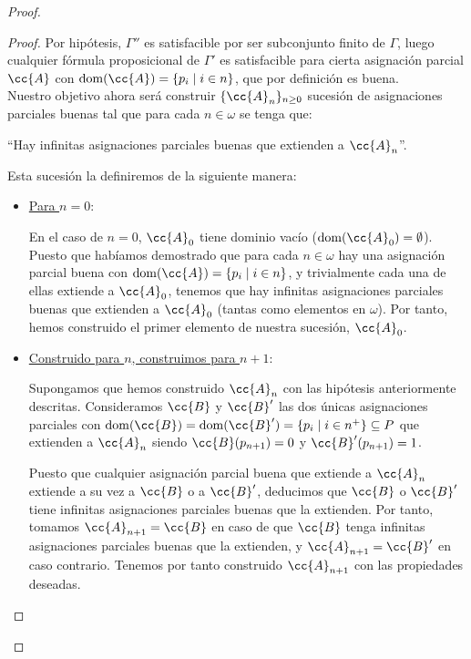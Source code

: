 \documentclass[12pt]{article}
\DeclareMathOperator{\dom}{dom}
\begin{document}
\begin{ejercicio}
\begin{proof}
\begin{description}
\begin{lema}
\begin{proof}
                        Por hipótesis, $\Gamma''$ es satisfacible por ser subconjunto finito de $\Gamma$, luego cualquier fórmula proposicional de $\Gamma'$ es satisfacible para 
                        cierta asignación parcial $\cc{A}$ con $\dom(\cc{A})=\{p_i\mid i\in n\}$, que por definición es buena.\\

                        Nuestro objetivo ahora será construir $\{\cc{A}_n\}_{n\geq 0}$ sucesión de asignaciones parciales buenas tal que para cada $n\in \omega$ se tenga que:
                        \begin{center}
                            ``Hay infinitas asignaciones parciales buenas que extienden a $\cc{A}_n$''.
                        \end{center}
                        
                        Esta sucesión la definiremos de la siguiente manera:
                        \begin{itemize}
                            \item \ul{Para $n=0$}:
                            
                            En el caso de $n=0$, $\cc{A}_0$ tiene dominio vacío ($\dom(\cc{A}_0)=\emptyset$).
                            Puesto que habíamos demostrado que para cada $n\in \omega$ hay una asignación parcial buena con $\dom(\cc{A})=\{p_i\mid i\in n\}$,
                            y trivialmente cada una de ellas extiende a $\cc{A}_0$, tenemos que hay infinitas asignaciones parciales buenas que extienden a $\cc{A}_0$ (tantas como elementos en $\omega$).
                            Por tanto, hemos construido el primer elemento de nuestra sucesión, $\cc{A}_0$.

                            \item \ul{Construido para $n$, construimos para $n+1$}:
                            
                            Supongamos que hemos construido $\cc{A}_n$ con las hipótesis anteriormente descritas.
                            Consideramos $\cc{B}$ y $\cc{B}'$ las dos únicas asignaciones parciales con $\dom(\cc{B})=\dom(\cc{B}')=\{p_i\mid i\in n^+\}\subseteq P$
                            que extienden a $\cc{A}_n$ siendo $\cc{B}(p_{n+1})=0$ y $\cc{B}'(p_{n+1})=1$.

                            Puesto que cualquier asignación parcial buena que extiende a $\cc{A}_n$ extiende a su vez a $\cc{B}$ o a $\cc{B}'$, deducimos que $\cc{B}$ o $\cc{B}'$ tiene infinitas asignaciones parciales buenas que la extienden.
                            Por tanto, tomamos $\cc{A}_{n+1}=\cc{B}$ en caso de que $\cc{B}$ tenga infinitas asignaciones parciales buenas que la extienden, y $\cc{A}_{n+1}=\cc{B}'$ en caso contrario.
                            Tenemos por tanto construido $\cc{A}_{n+1}$ con las propiedades deseadas.
                        \end{itemize}


\end{proof}
\end{lema}
\end{description}
\end{proof}
\end{ejercicio}
\end{document}
